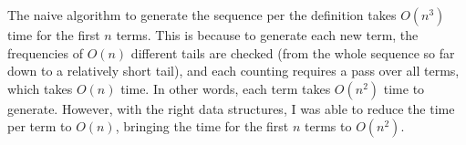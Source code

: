 \documentclass{article}
\begin{document}
The naive algorithm to generate the sequence per the definition
takes $O(n^3)$ time for the first $n$ terms.
This is because to generate each new term,
the frequencies of $O(n)$ different tails are checked
(from the whole sequence so far down to a relatively short tail),
and each counting requires a pass over all terms,
which takes $O(n)$ time.
In other words, each term takes $O(n^2)$ time to generate.
However, with the right data structures,
I was able to reduce the time per term to $O(n)$,
bringing the time for the first $n$ terms to $O(n^2)$.
\end{document}

